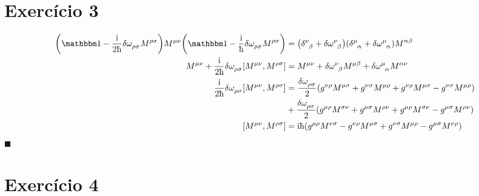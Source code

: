 \documentclass[twoside]{amsart}
\newcommand{\cqd}{\hfill$\blacksquare$}
\numberwithin{equation}{section}
\begin{document}

\section{Exercício 3}

\begin{align*}
    \qty(\mathbbm 1-\frac{\im}{2\hbar}\tensor{\delta\omega}{_\rho_\sigma}\tensor{M}{^\rho^\sigma})\tensor{M}{^\mu^\nu}\qty(\mathbbm 1-\frac{\im}{\hbar}\tensor{\delta\omega}{_\rho_\sigma}\tensor{M}{^\rho^\sigma})&=\qty(\tensor{\delta}{^\nu_\beta}+\tensor{\delta\omega}{^\nu_\beta})\qty(\tensor{\delta}{^\mu_\alpha}+\tensor{\delta\omega}{^\mu_\alpha})\tensor{M}{^\alpha^\beta}\\
    \tensor{M}{^\mu^\nu}+\frac{\im}{2\hbar}\tensor{\delta\omega}{_\rho_\sigma}\comm{\tensor{M}{^\mu^\nu}}{\tensor{M}{^\rho^\sigma}}&=\tensor{M}{^\mu^\nu}+\tensor{\delta\omega}{^\nu_\beta}\tensor{M}{^\mu^\beta}+\tensor{\delta\omega}{^\mu_\alpha}\tensor{M}{^\alpha^\nu}\\
    \frac{\im}{2\hbar}\tensor{\delta\omega}{_\rho_\sigma}\comm{\tensor{M}{^\mu^\nu}}{\tensor{M}{^\rho^\sigma}}&=\frac{\tensor{\delta\omega}{_\rho_\sigma}}{2}\qty(\tensor{g}{^\nu^\rho}\tensor{M}{^\mu^\sigma}+\tensor{g}{^\nu^\sigma}\tensor{M}{^\mu^\rho}+\tensor{g}{^\nu^\rho}\tensor{M}{^\mu^\sigma}-\tensor{g}{^\nu^\sigma}\tensor{M}{^\mu^\rho})\\
    &+\frac{\tensor{\delta\omega}{_\rho_\sigma}}{2}\qty(\tensor{g}{^\mu^\rho}\tensor{M}{^\sigma^\nu}+\tensor{g}{^\mu^\sigma}\tensor{M}{^\rho^\nu}+\tensor{g}{^\mu^\rho}\tensor{M}{^\sigma^\nu}-\tensor{g}{^\mu^\sigma}\tensor{M}{^\rho^\nu})\\
    \comm{\tensor{M}{^\mu^\nu}}{\tensor{M}{^\rho^\sigma}}&=\im\hbar\qty(\tensor{g}{^\mu^\rho}\tensor{M}{^\nu^\sigma}-\tensor{g}{^\nu^\rho}\tensor{M}{^\mu^\sigma}+\tensor{g}{^\nu^\sigma}\tensor{M}{^\mu^\rho}-\tensor{g}{^\mu^\sigma}\tensor{M}{^\nu^\rho})
\end{align*}
\cqd


\section{Exercício 4}
\end{document}
